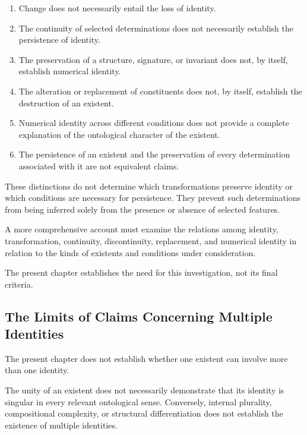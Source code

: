 \begin{enumerate}
    \item Change does not necessarily entail the loss
    of identity.

    \item The continuity of selected determinations
    does not necessarily establish the persistence
    of identity.

    \item The preservation of a structure, signature,
    or invariant does not, by itself, establish
    numerical identity.

    \item The alteration or replacement of constituents
    does not, by itself, establish the destruction
    of an existent.

    \item Numerical identity across different conditions
    does not provide a complete explanation of the
    ontological character of the existent.

    \item The persistence of an existent and the
    preservation of every determination associated
    with it are not equivalent claims.
\end{enumerate}

These distinctions do not determine which transformations
preserve identity or which conditions are necessary for
persistence. They prevent such determinations from being
inferred solely from the presence or absence of selected
features.

A more comprehensive account must examine the relations
among identity, transformation, continuity, discontinuity,
replacement, and numerical identity in relation to the
kinds of existents and conditions under consideration.

The present chapter establishes the need for this
investigation, not its final criteria.

\subsection{The Limits of Claims Concerning Multiple Identities}

The present chapter does not establish whether one
existent can involve more than one identity.

The unity of an existent does not necessarily demonstrate
that its identity is singular in every relevant
ontological sense. Conversely, internal plurality,
compositional complexity, or structural differentiation
does not establish the existence of multiple identities.


